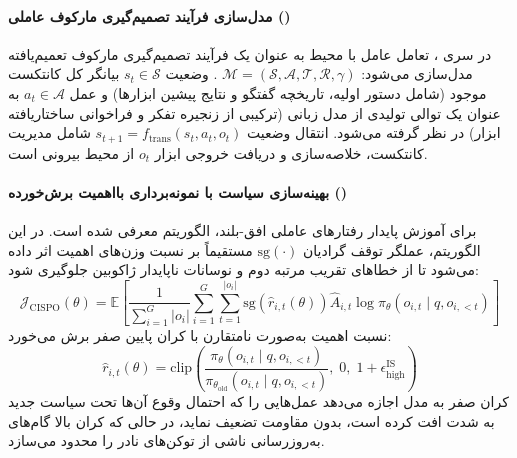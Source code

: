 \item {}

\paragraph*{مدل‌سازی فرآیند تصمیم‌گیری مارکوف عاملی ()}
در سری ، تعامل عامل با محیط به عنوان یک فرآیند تصمیم‌گیری مارکوف تعمیم‌یافته مدل‌سازی می‌شود: $\mathcal{M} = (\mathcal{S}, \mathcal{A}, \mathcal{T}, \mathcal{R}, \gamma)$ \cite{minimax2026m2}. وضعیت $s_t \in \mathcal{S}$ بیانگر کل کانتکست موجود (شامل دستور اولیه، تاریخچه گفتگو و نتایج پیشین ابزارها) و عمل $a_t \in \mathcal{A}$ به عنوان یک توالی تولیدی از مدل زبانی (ترکیبی از زنجیره تفکر و فراخوانی ساختاریافته ابزار) در نظر گرفته می‌شود. انتقال وضعیت $s_{t+1} = f_{\text{trans}}(s_t, a_t, o_t)$ شامل مدیریت کانتکست، خلاصه‌سازی و دریافت خروجی ابزار $o_t$ از محیط بیرونی است.

\paragraph*{بهینه‌سازی سیاست با نمونه‌برداری بااهمیت برش‌خورده ()}
برای آموزش پایدار رفتارهای عاملی افق-بلند، الگوریتم  معرفی شده است. در این الگوریتم، عملگر توقف گرادیان $\text{sg}(\cdot)$ مستقیماً بر نسبت وزن‌های اهمیت اثر داده می‌شود تا از خطاهای تقریب مرتبه دوم و نوسانات ناپایدار ژاکوبین جلوگیری شود:
\begin{equation}
    \mathcal{J}_{\text{CISPO}}(\theta) = \mathbb{E} \left[ \frac{1}{\sum_{i=1}^G |o_i|} \sum_{i=1}^G \sum_{t=1}^{|o_i|} \text{sg}\left( \hat{r}_{i,t}(\theta) \right) \hat{A}_{i,t} \log \pi_\theta(o_{i,t} \mid q, o_{i,<t}) \right]
\end{equation}
نسبت اهمیت به‌صورت نامتقارن با کران پایین صفر برش می‌خورد:
\begin{equation}
    \hat{r}_{i,t}(\theta) = \text{clip}\left( \frac{\pi_\theta(o_{i,t} \mid q, o_{i,<t})}{\pi_{\theta_{\text{old}}}(o_{i,t} \mid q, o_{i,<t})}, \; 0, \; 1 + \epsilon_{\text{high}}^{\text{IS}} \right)
\end{equation}
کران صفر به مدل اجازه می‌دهد عمل‌هایی را که احتمال وقوع آن‌ها تحت سیاست جدید به شدت افت کرده است، بدون مقاومت تضعیف نماید، در حالی که کران بالا گام‌های به‌روزرسانی ناشی از توکن‌های نادر را محدود می‌سازد.

